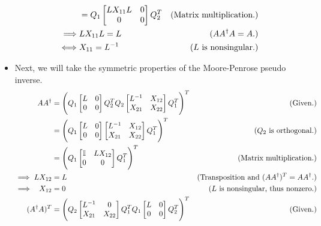 \begin{solution}
\begin{itemize}
\begin{align}
            &= Q_1\begin{bmatrix}LX_{11}L &0 \\0&0\end{bmatrix}Q_2^T &\text{(Matrix multiplication.)}\nonumber\\
            \implies &LX_{11}L = L &(AA^\dag A = A.)\nonumber\\
            \iff &X_{11} = L^{-1} &\text{($L$ is nonsingular.)}\nonumber
        \end{align}
        \alignbreak
        \vspace{-5mm}
        \newpage
        \item Next, we will take the symmetric properties of the Moore-Penrose pseudo inverse.
        \alignbreak
        \begin{align}
        AA^\dag &= \Bigg( Q_1\begin{bmatrix}L &0\\0 &0\end{bmatrix}Q_2^TQ_2\begin{bmatrix}L^\inv &X_{12}\\ X_{21} &X_{22}\end{bmatrix}Q_1^T\Bigg)^T &\text{(Given.)}\nonumber\\
        &= \Bigg( Q_1\begin{bmatrix}L &0\\0 &0\end{bmatrix}\begin{bmatrix}L^\inv &X_{12}\\ X_{21} &X_{22}\end{bmatrix}Q_1^T\Bigg)^T &\text{($Q_2$ is orthogonal.)}\nonumber\\
        &= \Bigg( Q_1\begin{bmatrix}\id &LX_{12}\\0 &0\end{bmatrix}Q_1^T\Bigg)^T &\text{(Matrix multiplication.)}\nonumber\\
        \implies LX_{12} &= L &\text{(Transposition and $(AA^\dag)^T = AA^\dag$.)}\nonumber\\
        \implies \ \  X_{12} &= 0 &\text{($L$ is nonsingular, thus nonzero.)}\nonumber\\
        (A^\dag A)^T &= \Bigg( Q_2 \begin{bmatrix}L^\inv &0 \\X_{21} &X_{22}\end{bmatrix}Q_1^TQ_1\begin{bmatrix}L &0\\0&0\end{bmatrix}Q_2^T\Bigg)^T &\text{(Given.)}\nonumber\\

\end{align}
\end{itemize}
\end{solution}
